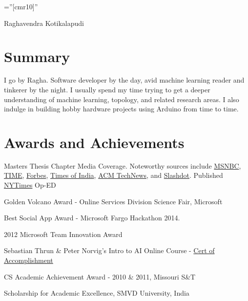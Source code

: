 \documentclass[a4paper,11pt]{article}
\makeatletter
\newcommand*{\compress}{\@minipagetrue}
\makeatother
\begin{document}
\pagestyle{empty} %
\font\fb=''[cmr10]'' %


\par{\centering
		{\Huge Raghavendra Kotikalapudi
    }\bigskip\par}

\section{Summary}
I go by Ragha. Software developer by the day, avid machine learning reader and tinkerer by the night. I usually spend my time trying to get a deeper understanding of machine learning, topology, and related research areas. I also indulge in building hobby hardware projects using Arduino from time to time.

\section{Awards and Achievements}
\begin{minipage}[t]{\textwidth}
    \begin{compactitem} \compress
        \item Masters Thesis Chapter Media Coverage. Noteworthy sources include \href{http://vitals.msnbc.msn.com/_news/2012/05/18/11757211-depressed-people-spend-more-time-chatting-online?lite}{MSNBC}, \href{http://healthland.time.com/2012/06/22/the-internet-knows-youre-depressed-but-can-it-help-you/}{TIME}, \href{http://www.forbes.com/sites/kashmirhill/2012/06/21/fascinating-how-you-use-the-internet-may-reveal-youre-depressed/}{Forbes}, \href{http://articles.timesofindia.indiatimes.com/2012-05-17/computing/31748166_1_depressed-students-internet-usage-internet-data}{Times of India}, \href{http://technews.acm.org/archives.cfm?fo=2012-05-may/may-21-2012.html#583682}{ACM TechNews}, and
            \href{http://tech.slashdot.org/story/12/05/22/2039246/depressed-people-surf-the-web-differently}{Slashdot}. Published \href{http://www.nytimes.com/2012/06/17/opinion/sunday/how-depressed-people-use-the-internet.html?_r=3}{NYTimes} Op-ED
        \item Golden Volcano Award  - Online Services Division Science Fair, Microsoft
        \item Best Social App Award - Microsoft Fargo Hackathon 2014.
        \item 2012 Microsoft Team Innovation Award
        \item Sebastian Thrun \& Peter Norvig's Intro to AI Online Course - \href{http://tinyurl.com/ai-cert}{Cert of Accomplishment}
        \item CS Academic Achievement Award - 2010 \& 2011, Missouri S\&T
        \item Scholarship for Academic Excellence, SMVD University, India
    \end{compactitem}
\end{minipage}
\end{document}
